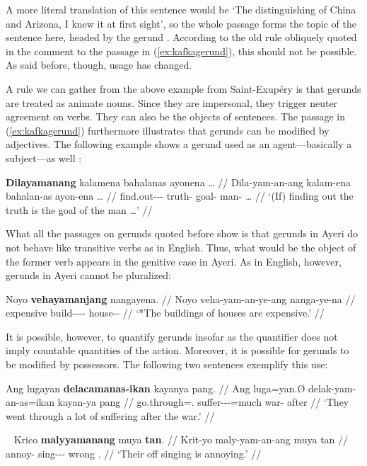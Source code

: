 A more literal translation of this sentence would be `The distinguishing of
China and Arizona, I knew it at first sight', so the whole passage
 forms the topic of the
sentence here, headed by the gerund
. According to the old rule
obliquely quoted in the comment to the passage in (\ref{ex:kafkagerund}), this
should not be possible. As said before, though, usage has changed.

A rule we can gather from the above example from Saint-Exupéry is that gerunds
are treated as animate nouns. Since they are impersonal, they trigger neuter
agreement on verbs. They can also be the objects of sentences. The passage in
(\ref{ex:kafkagerund}) furthermore illustrates that gerunds can be modified by
adjectives. The following example shows a gerund used as an agent---basically a
subject---as well \citep{benung:scientificmethod}:

\ex\label{ex:scimethgerund}\begingl
	\gla \textbf{Dilayamanang} kalamena bahalanas ayonena … //
	\glb Dila-yam-an-ang kalam-ena bahalan-as ayon-ena … //
	\glc find.out-\Ptcp{}-\Nmlz{}-\Aarg{} truth-\Gen{} goal-\Parg{} 
		man-\Gen{} … //
	\glft `(If) finding out the truth is the goal of the man …' //
\endgl\xe

What all the passages on gerunds quoted before show is that gerunds in Ayeri do
not behave like transitive verbs as in English. Thus, what would be the object
of the former verb appears in the genitive case in Ayeri. As in English,
however, gerunds in Ayeri cannot be pluralized:

\ex\ljudge* \begingl
	\gla Noyo \textbf{vehayamanjang} nangayena. //
	\glb Noyo veha-yam-an-ye-ang nanga-ye-na //
	\glc expensive build-\Ptcp{}-\Nmlz{}-\Pl{}-\Aarg{} house-\Pl{}-\Gen{} //
	\glft `*The buildings of houses are expensive.' //
\endgl\xe

It is possible, however, to quantify gerunds insofar as the quantifier does not
imply countable quantities of the action. Moreover, it is possible for gerunds
to be modified by possessors. The following two sentences exemplify this use:

\ex\begingl
	\gla Ang lugayan \textbf{delacamanas-ikan} kayanya pang. //
	\glb Ang luga=yan.Ø delak-yam-an-as=ikan kayan-ya pang //
	\glc \AgtT{} go.through=\TplM{}.\Top{} 
		suffer-\Ptcp{}-\Nmlz{}-\Parg{}=much war-\Loc{} after //
	\glft `They went through a lot of suffering after the war.' //
\endgl\xe

\ex~\begingl
	\gla Krico \textbf{malyyamanang} muya \textbf{tan}. //
	\glb Krit-yo maly-yam-an-ang muya tan //
	\glc annoy-\TsgN{} sing-\Ptcp{}-\Nmlz{}-\Aarg{} wrong \TplM{}.\Gen{} //
	\glft `Their off singing is annoying.' //
\endgl\xe

